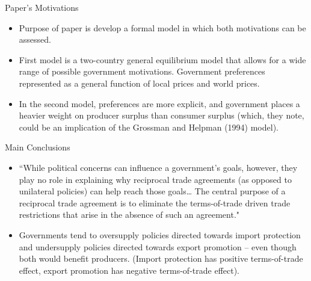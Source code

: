 \documentclass[aspectratio=169]{beamer}
\begin{document}

\begin{frame}{Paper's Motivations}

\begin{itemize}
    \item<1-> Purpose of paper is develop a formal model in which both motivations can be assessed.
    \item<2-> First model is a two-country general equilibrium model that allows for a wide range of possible government motivations.  Government preferences represented as a general function of local prices and world prices.
    \item<3-> In the second model, preferences are more explicit, and government places a heavier weight on producer surplus than consumer surplus (which, they note, could be an implication of the Grossman and Helpman (1994) model).
\end{itemize}
    
\end{frame}


\begin{frame}{Main Conclusions}

\begin{itemize}
    \item<1-> ``While political concerns can influence a government’s goals, however, they play no role in explaining why reciprocal trade agreements (as opposed to unilateral policies) can help reach those goals… The central purpose of a reciprocal trade agreement is to eliminate the terms-of-trade driven trade restrictions that arise in the absence of such an agreement."
    \item<2-> Governments tend to oversupply policies directed towards import protection and undersupply policies directed towards export promotion – even though both would benefit producers.  (Import protection has positive terms-of-trade effect, export promotion has negative terms-of-trade effect).
\end{itemize}
    
\end{frame}

\end{document}

